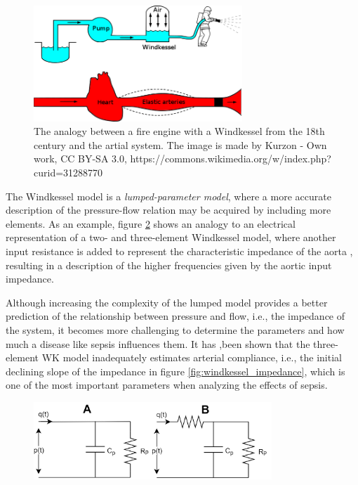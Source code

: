 \begin{figure}[b!]
    \centering
    \includegraphics[width=0.7\textwidth]{fig/theory/Windkessel_effect.png}
    \caption{The analogy between a fire engine with a Windkessel from the 18th century and the artial system. The image is made by Kurzon - Own work, CC BY-SA 3.0, https://commons.wikimedia.org/w/index.php?curid=31288770}
    \label{fig:sepsis_epidemimology}
\end{figure}{}

The Windkessel model is a \textit{lumped-parameter model}, where a more accurate description of the pressure-flow relation may be acquired by including more elements. As an example, figure \ref{fig:Windkessel_circuit} shows an analogy to an electrical representation of a two- and three-element Windkessel model, where another input resistance is added to represent the characteristic impedance of the aorta \cite{RN11}, resulting in a description of the higher frequencies given by the aortic input impedance. 

Although increasing the complexity of the lumped model provides a better prediction of the relationship between pressure and flow, i.e., the impedance of the system, it becomes more challenging to determine the parameters and how much a disease like sepsis influences them. It has ,been shown that the three-element WK model inadequately estimates arterial compliance, i.e., the initial declining slope of the impedance in figure \ref{fig:windkessel_impedance}, \cite{RN18} which is one of the most important parameters when analyzing the effects of sepsis. 

\begin{figure}[t!]
    \centering
    \includegraphics[width=0.8\textwidth]{fig/theory/Windkessel_circuit.jpg}
    \caption{}
    \label{fig:Windkessel_circuit}
\end{figure}{}

